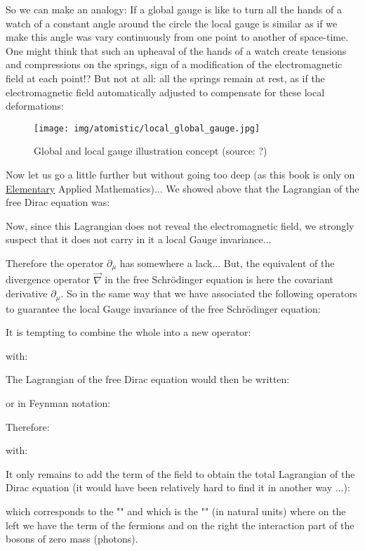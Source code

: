 	So we can make an analogy: If a global gauge is like to turn all the hands of a watch of a constant angle around the circle the local gauge is similar as if we make this angle was vary continuously from one point to another of space-time. One might think that such an upheaval of the hands of a watch create tensions and compressions on the springs, sign of a modification of the electromagnetic field at each point!? But not at all: all the springs remain at rest, as if the electromagnetic field automatically adjusted to compensate for these local deformations:
	\begin{figure}[H]
		\centering
		\texttt{[image: img/atomistic/local\_global\_gauge.jpg]}
		\caption[Global and local gauge illustration concept]{Global and local gauge illustration concept (source: ?)}
	\end{figure}

	Now let us go a little further but without going too deep (as this book is only on \underline{Elementary} Applied Mathematics)... We showed above that the Lagrangian of the free Dirac equation was:
	
	Now, since this Lagrangian does not reveal the electromagnetic field, we strongly suspect that it does not carry in it a local Gauge invariance...
	
	Therefore the operator $\partial_\mu$ has somewhere a lack... But, the equivalent of the divergence operator $\vec{\nabla}$ in the free Schrödinger equation is here the covariant derivative $\partial_\mu$. So in the same way that we have associated the following operators to guarantee the local Gauge invariance of the free Schrödinger equation:
	
	It is tempting to combine the whole into a new operator:
	
	with:
	
	The Lagrangian of the free Dirac equation would then be written:
	
	or in Feynman notation:
	
	Therefore:
	
	with:
	
	It only remains to add the term of the field to obtain the total Lagrangian of the Dirac equation (it would have been relatively hard to find it in another way ...):
	
	which corresponds to the "" and which is the "\label{quantum electrodynamics}" (in natural units) where on the left we have the term of the fermions and on the right the interaction part of the bosons of zero mass (photons).

